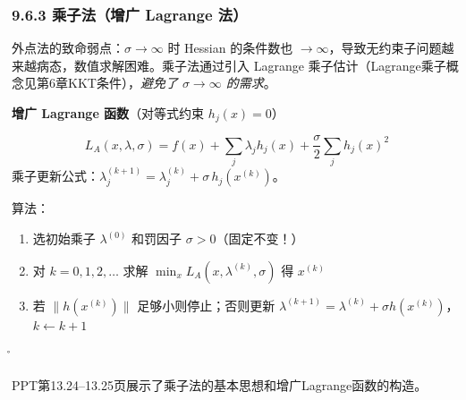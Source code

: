 \subsubsection{9.6.3 乘子法（增广 Lagrange 法）}

外点法的致命弱点：$\sigma \to \infty$ 时 Hessian 的条件数也 $\to \infty$，导致无约束子问题越来越病态，数值求解困难。乘子法通过引入 Lagrange 乘子估计（Lagrange乘子概念见第6章KKT条件），\emph{避免了 $\sigma \to \infty$ 的需求}。

\begin{defbox}
\textbf{增广 Lagrange 函数}（对等式约束 $h_j(x)=0$）

\[
L_A(x, \lambda, \sigma) = f(x) + \sum_j \lambda_j h_j(x) + \frac{\sigma}{2}\sum_j h_j(x)^2
\]
乘子更新公式：$\lambda_j^{(k+1)} = \lambda_j^{(k)} + \sigma\, h_j(x^{(k)})$。

算法：
\begin{enumerate}
  \item 选初始乘子 $\lambda^{(0)}$ 和罚因子 $\sigma > 0$（固定不变！）
  \item 对 $k=0,1,2,\dots$ 求解 $\min_x L_A(x, \lambda^{(k)}, \sigma)$ 得 $x^{(k)}$
  \item 若 $\|h(x^{(k)})\|$ 足够小则停止；否则更新 $\lambda^{(k+1)} = \lambda^{(k)} + \sigma h(x^{(k)})$，$k \leftarrow k+1$
\end{enumerate}
\end{defbox}

\r{}

PPT第13.24--13.25页展示了乘子法的基本思想和增广Lagrange函数的构造。

\medskip
{}
\medskip
{}
\medskip

